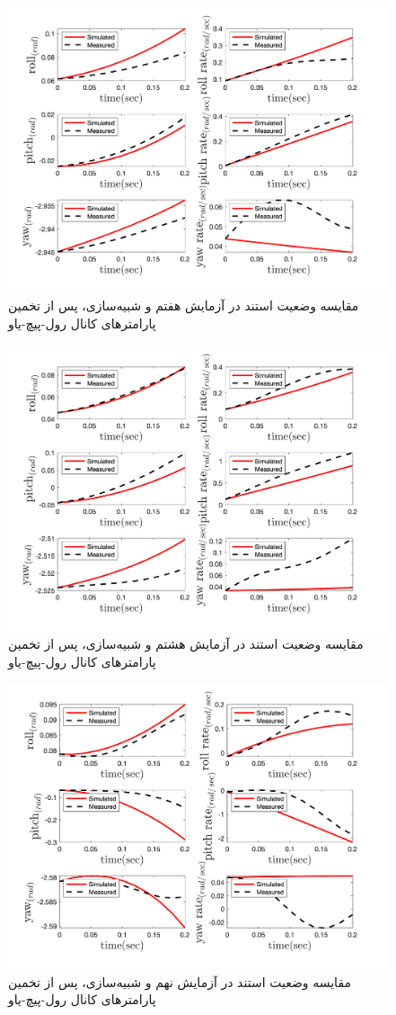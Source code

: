 \begin{figure}[H]
	\includegraphics[width=12cm]{../../Figures/RCP/roll_pitch_yaw_parameter_estimation/RCP_roll_pitch_yaw_S8.png}
	\centering
	\caption{مقايسه وضعیت استند در  آزمايش هفتم و شبیه‌سازی، پس از تخمین پارامترهای کانال رول-پیچ-یاو}
	\label{ roll_pitch_yaw_ps7}
\end{figure}
\begin{figure}[H]
	\includegraphics[width=12cm]{../../Figures/RCP/roll_pitch_yaw_parameter_estimation/RCP_roll_pitch_yaw_S9.png}
	\centering
	\caption{مقايسه وضعیت استند در  آزمايش هشتم و شبیه‌سازی، پس از تخمین پارامترهای کانال رول-پیچ-یاو}
	\label{ roll_pitch_yaw_ps8}
\end{figure}
\begin{figure}[H]
	\includegraphics[width=12cm]{../../Figures/RCP/roll_pitch_yaw_parameter_estimation/RCP_roll_pitch_yaw_S10.png}
	\centering
	\caption{مقايسه وضعیت استند در  آزمايش نهم و شبیه‌سازی، پس از تخمین پارامترهای کانال رول-پیچ-یاو}
	\label{ roll_pitch_yaw_ps9}
\end{figure}
